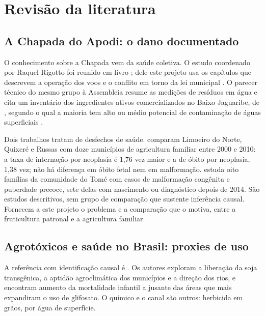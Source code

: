 \chapter{Revisão da literatura}
\label{sec:literatura}

\section{A Chapada do Apodi: o dano documentado}

O conhecimento sobre a Chapada vem da saúde coletiva. O estudo coordenado por
Raquel Rigotto foi reunido em livro \cite{rigotto2011livro}; dele este projeto
usa os capítulos que descrevem a operação dos voos e o conflito em torno da lei
municipal \cite{marinho2011dimensao, teixeira2011rebulico}. O parecer técnico
do mesmo grupo à Assembleia resume as medições de resíduos em água e cita um
inventário dos ingredientes ativos comercializados no Baixo Jaguaribe, de
, segundo o qual a maioria tem alto ou médio
potencial de contaminação de águas superficiais \cite{tramas2016parecer}.

Dois trabalhos tratam de desfechos de saúde.  comparam
Limoeiro do Norte, Quixeré e Russas com doze municípios de agricultura familiar
entre 2000 e 2010: a taxa de internação por neoplasia é 1,76 vez maior e a de
óbito por neoplasia, 1,38 vez; não há diferença em óbito fetal nem em
malformação.  estuda oito famílias da comunidade do Tomé com
casos de malformação congênita e puberdade precoce, sete delas com nascimento
ou diagnóstico depois de 2014. São estudos descritivos, sem grupo de comparação
que sustente inferência causal. Fornecem a este
projeto o problema e a comparação que o motiva, entre a fruticultura patronal e
a agricultura familiar.

\section{Agrotóxicos e saúde no Brasil: proxies de uso}

A referência com identificação causal é . Os autores
exploram a liberação da soja transgênica, a aptidão agroclimática dos
municípios e a direção dos rios, e encontram aumento da mortalidade infantil a
jusante das áreas que mais expandiram o uso de glifosato. O químico e o canal
são outros: herbicida em grãos, por água de superfície.

